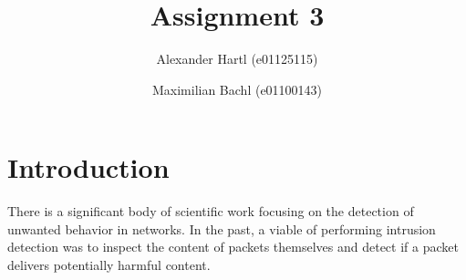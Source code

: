 \documentclass[sigconf,nonacm]{acmart}
\begin{document}
\title{Assignment 3}

\author{Alexander Hartl (e01125115)}

\author{Maximilian Bachl (e01100143)}
\authornotemark[1]

\renewcommand{\shortauthors}{Hartl and Bachl}


\maketitle

\section{Introduction}

There is a significant body of scientific work focusing on the detection of unwanted behavior in networks. In the past, a viable of performing intrusion detection was to inspect the content of packets themselves and detect if a packet delivers potentially harmful content. 
\end{document}
